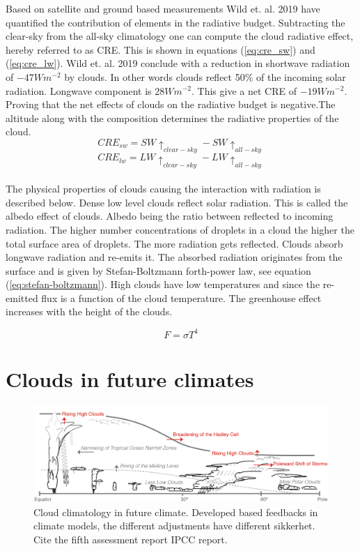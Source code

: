 Based on satellite and ground based measurements Wild et. al. 2019 have quantified the contribution of elements in the radiative budget. Subtracting the clear-sky from the all-sky climatology one can compute the cloud radiative effect, hereby referred to as CRE. This is shown in equations (\ref{eq:cre_sw}) and (\ref{eq:cre_lw}). Wild et. al. 2019 conclude with a reduction in shortwave radiation of $-47Wm^{-2}$ by clouds. In other words clouds reflect 50\% of the incoming solar radiation. Longwave component is $28Wm^{-2}$. This give a net CRE of $-19Wm^{-2}$. Proving that the net effects of clouds on the radiative budget is negative.The altitude along with the composition determines the radiative properties of the cloud.
\begin{equation} \label{eq:cre_sw}
    CRE_{sw} = SW\uparrow_{clear-sky} - SW\uparrow_{all-sky}
\end{equation}
\begin{equation} \label{eq:cre_lw}
    CRE_{lw} = LW\uparrow_{clear-sky} - LW\uparrow_{all-sky}
\end{equation}
\\
The physical properties of clouds causing the interaction with radiation is described below. Dense low level clouds reflect solar radiation. This is called the albedo effect of clouds. Albedo being the ratio between reflected to incoming radiation. The higher number concentrations of droplets in a cloud the higher the total surface area of droplets. The more radiation gets reflected. Clouds absorb longwave radiation and re-emits it. The absorbed radiation originates from the surface and is given by Stefan-Boltzmann forth-power law, see equation (\ref{eq:stefan-boltzmann}). High clouds have low temperatures and since the re-emitted flux is a function of the cloud temperature. The greenhouse effect increases with the height of the clouds.

\begin{equation} \label{eq:stefan-boltzmann}
    F = \sigma T ^4
\end{equation}

\section{Clouds in future climates}
\begin{figure}
    \centering
    \includegraphics[scale = 0.8]{Chapter1_Intro/images/Fig7-11_ipcc.jpg}
    \caption{Cloud climatology in future climate. Developed based feedbacks in climate models, the different adjustments have different sikkerhet. Cite the fifth assessment report IPCC report.}
    \label{fig:cloud_scheme}
\end{figure}

